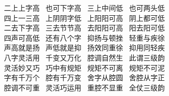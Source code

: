 {\hspace*{50pt}~ 二上上字高~\hspace{40pt} 也可下字高~\hspace{40pt} 三上中间低~\hspace{40pt} 也可两头低\\
\hspace*{50pt}~ 四上一三高~\hspace{40pt} 上阴阴字低~\hspace{40pt} 上阳阳可高~\hspace{40pt} 阴上都可低\\
\hspace*{50pt}~ 二去下字高~\hspace{40pt} 三去节节高~\hspace{40pt} 去阳阳可高~\hspace{40pt} 阳去阳可低\\
\hspace*{50pt}~ 四声可高低~\hspace{40pt} 还有八个字~\hspace{40pt} 抑扬与顿挫~\hspace{40pt} 轻重与疾徐\\
\hspace*{50pt}~ 声高就是扬~\hspace{40pt} 声低就是抑~\hspace{40pt} 扬效同重徐~\hspace{40pt} 抑用同轻疾\\
\hspace*{50pt}~ 八字灵活用~\hspace{40pt} 千变又万化~\hspace{40pt} 腔调自然生~\hspace{40pt} 此谓三级韵\\
\hspace*{50pt}~ 灵活妙又巧~\hspace{40pt} 巧中有规矩~\hspace{40pt} 规矩不可离~\hspace{40pt} 规矩不可泥\\
\hspace*{50pt}~ 字有千万个~\hspace{40pt} 腔有千万变~\hspace{40pt} 舍字从腔圆~\hspace{40pt} 舍腔从字正\\
\hspace*{50pt}~ 腔调不可重~\hspace{40pt} 灵活巧运用~\hspace{40pt} 重腔不显重~\hspace{40pt} 全仗三级韵}


